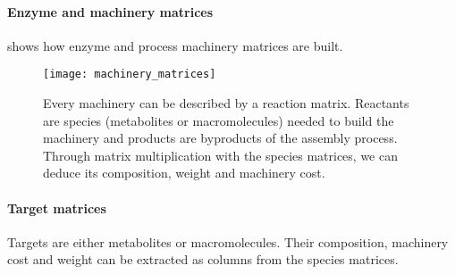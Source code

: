 \paragraph{Enzyme and machinery matrices}
 shows how enzyme and process machinery matrices are built.
\begin{figure}
  \centering
  \texttt{[image: machinery\_matrices]}
  \caption{Every machinery can be described by a reaction matrix.
  Reactants are species (metabolites or macromolecules) needed to build the machinery
  and products are byproducts of the assembly process.
  Through matrix multiplication with the species matrices,
  we can deduce its composition, weight and machinery cost.}
  \label{fig:machinery_matrices}
\end{figure}

\paragraph{Target matrices}
Targets are either metabolites or macromolecules.
Their composition, machinery cost and weight can be extracted as columns from the species matrices.
